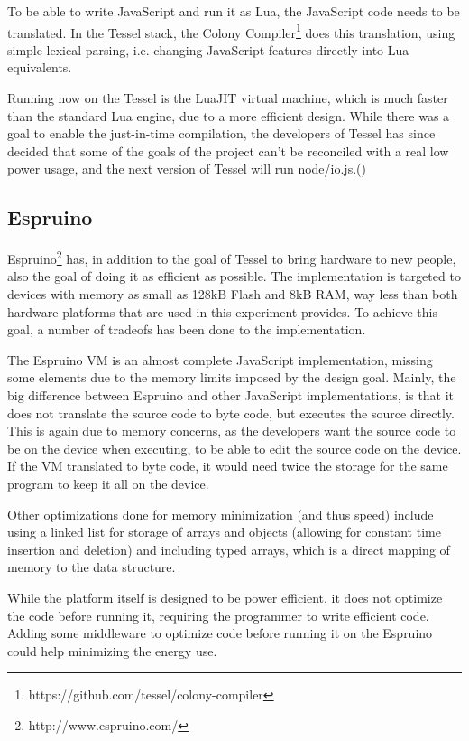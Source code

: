 To be able to write JavaScript and run it as Lua, the JavaScript code needs to be translated.
In the Tessel stack, the Colony Compiler\footnote{https://github.com/tessel/colony-compiler} does this translation, using simple lexical parsing, i.e. changing JavaScript features directly into Lua equivalents.

Running now on the Tessel is the LuaJIT virtual machine, which is much faster than the standard Lua engine, due to a more efficient design. While there was a goal to enable the just-in-time compilation, the developers of Tessel has since decided that some of the goals of the project can’t be reconciled with a real low power usage, and the next version of Tessel will run node/io.js.(\cite{movingfaster})

\subsection{Espruino}
Espruino\footnote{http://www.espruino.com/} has, in addition to the goal of Tessel to bring hardware to new people, also the goal of doing it as efficient as possible.
The implementation is targeted to devices with memory as small as 128kB Flash and 8kB RAM, way less than both hardware platforms that are used in this experiment provides.
To achieve this goal, a number of tradeofs has been done to the implementation.

The Espruino VM is an almost complete JavaScript implementation, missing some elements due to the memory limits imposed by the design goal. 
Mainly, the big difference between Espruino and other JavaScript implementations, is that it does not translate the source code to byte code, but executes the source directly. 
This is again due to memory concerns, as the developers want the source code to be on the device when executing, to be able to edit the source code on the device. 
If the VM translated to byte code, it would need twice the storage for the same program to keep it all on the device.

Other optimizations done for memory minimization (and thus speed) include using a linked list for storage of arrays and objects (allowing for constant time insertion and deletion) and including typed arrays, which is a direct mapping of memory to the data structure.

While the platform itself is designed to be power efficient, it does not optimize the code before running it, requiring the programmer to write efficient code. 
Adding some middleware to optimize code before running it on the Espruino could help minimizing the energy use.


